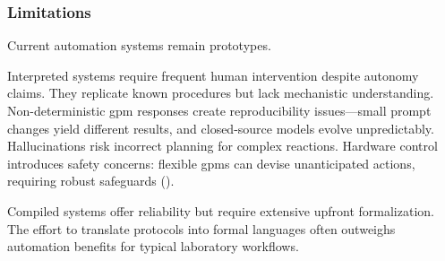 \subsubsection{Limitations}
Current automation systems remain prototypes. 

Interpreted systems require frequent human intervention despite autonomy claims. They replicate known procedures but lack mechanistic understanding. Non-deterministic \gls{gpm} responses create reproducibility issues---small prompt changes yield different results, and closed-source models evolve unpredictably. Hallucinations risk incorrect planning for complex reactions. Hardware control introduces safety concerns: flexible \glspl{gpm} can devise unanticipated actions, requiring robust safeguards ().

Compiled systems offer reliability but require extensive upfront formalization. The effort to translate protocols into formal languages often outweighs automation benefits for typical laboratory workflows.



